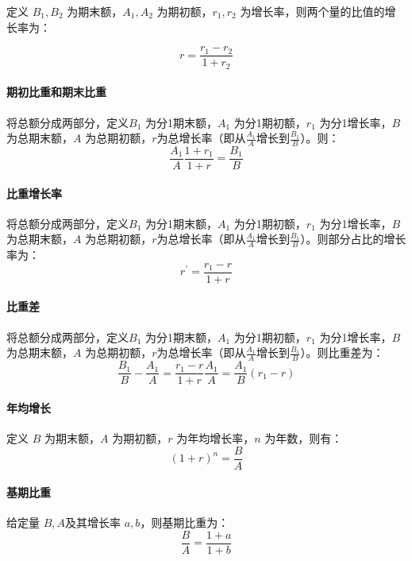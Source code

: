 定义 $B_1,B_2$ 为期末额，$A_1,A_2$ 为期初额，$r_1,r_2$ 为增长率，则两个量的比值的增长率为：

\[
	r = \frac{r_1-r_2}{1+r_2}
\]

\paragraph{期初比重和期末比重}

将总额分成两部分，定义$B_1$ 为分1期末额，$A_1$ 为分1期初额，$r_1$ 为分1增长率，$B$ 为总期末额，$A$ 为总期初额，$r$为总增长率（即从$\frac{A_1}{A}$增长到$\frac{B_1}{B}$）。则：
\[
	\frac{A_1}{A} \frac{1+r_1}{1+r} = \frac{B_1}{B}
\]

\paragraph{比重增长率}

将总额分成两部分，定义$B_1$ 为分1期末额，$A_1$ 为分1期初额，$r_1$ 为分1增长率，$B$ 为总期末额，$A$ 为总期初额，$r$为总增长率（即从$\frac{A_1}{A}$增长到$\frac{B_1}{B}$）。则部分占比的增长率为：
\[
	r^\prime = \frac{r_1-r}{1+r}
\]

\paragraph{比重差}
将总额分成两部分，定义$B_1$ 为分1期末额，$A_1$ 为分1期初额，$r_1$ 为分1增长率，$B$ 为总期末额，$A$ 为总期初额，$r$为总增长率（即从$\frac{A_1}{A}$增长到$\frac{B_1}{B}$）。则比重差为：
\[
	\frac{B_1}{B} - \frac{A_1}{A} = \frac{r_1 - r}{1+r}\frac{A_1}{A} = \frac{A_1}{B} (r_1-r)
\]

\paragraph{年均增长}

定义 $B$ 为期末额，$A$ 为期初额，$r$ 为年均增长率，$n$ 为年数，则有：
\[
	(1+r)^n = \frac{B}{A}
\]

\paragraph{基期比重}
给定量 $B, A$及其增长率 $a, b$，则基期比重为：
\[
	\frac{B}{A} = \frac{1+a}{1+b}
\]